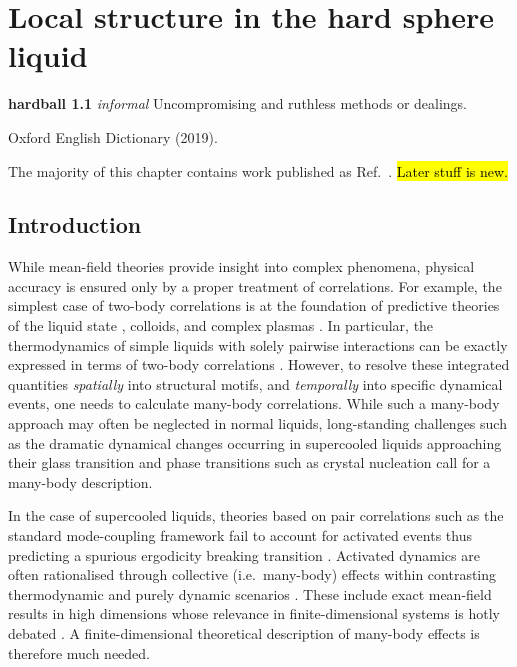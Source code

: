 \documentclass[11pt,twoside]{report}
\begin{document}
\chapter{Local structure in the hard sphere liquid}
\epigraph{\textbf{hardball 1.1} \emph{informal} Uncompromising and ruthless methods or dealings.}{Oxford English Dictionary (2019).}
\label{chapter:morphometric-applications}

The majority of this chapter contains work published as Ref.\ \cite{RobinsonPRL2019}.
\hl{Later stuff is new.}

\section{Introduction}

While mean-field theories provide insight into complex phenomena, physical accuracy is ensured only by a proper treatment of correlations.
For example, the simplest case of two-body correlations is at the foundation of predictive theories of the liquid state \cite{Hansen2013}, colloids, and complex plasmas \cite{LikosPR2001,Ivlev2012}.
In particular, the thermodynamics of simple liquids with solely pairwise interactions can be exactly expressed in terms of two-body correlations \cite{Hansen2013}.
However, to resolve these integrated quantities \emph{spatially} into structural motifs, and \emph{temporally} into specific dynamical events, one needs to calculate many-body correlations.
While such a many-body approach may often be neglected in normal liquids, long-standing challenges such as the dramatic dynamical changes occurring in supercooled liquids approaching their glass transition \cite{BerthierRMP2011,RoyallPR2015} and phase transitions such as crystal nucleation \cite{RussoSR2012} call for a many-body description.

In the case of supercooled liquids, theories based on pair correlations such as the standard mode-coupling framework \cite{Gotze2009} fail to account for activated events thus predicting a spurious ergodicity breaking transition \cite{BrambillaPRL2009,HallettNC2018}.
Activated dynamics are often rationalised through collective (i.e.\ many-body) effects within contrasting thermodynamic and purely dynamic scenarios \cite{LubchenkoARPC2007,TarjusJPCM2005,BiroliPRL2006,JanssenPRL2015,SzamelPTEP2013,ChandlerARPC2010}.
These include exact mean-field results in high dimensions \cite{ParisiRMP2010,CharbonneauARCMP2017} whose relevance in finite-dimensional systems is hotly debated \cite{WyartPRL2017}.
A finite-dimensional theoretical description of many-body effects is therefore much needed.
\end{document}
